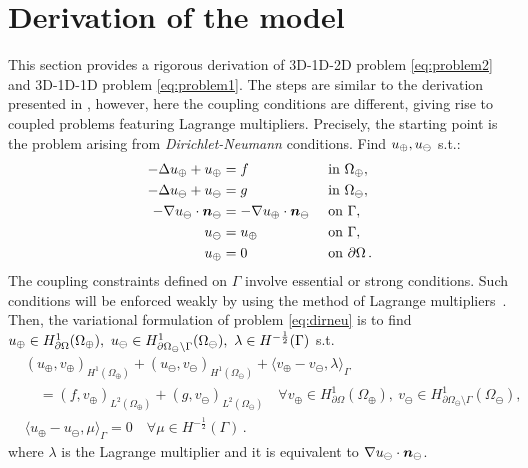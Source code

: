 
\section{Derivation of the model}
This section provides a rigorous derivation of 3D-1D-2D problem \eqref{eq:problem2} and 3D-1D-1D problem \eqref{eq:problem1}. 
The steps are similar to the derivation presented in \cite{laurino_m2an}, 
however, here the coupling conditions are different,
giving rise to coupled problems featuring Lagrange multipliers. 
Precisely, the starting point is the problem arising from \emph{Dirichlet-Neumann} conditions. 
Find $u_{\oplus},u_{\ominus}$ s.t.:
\begin{subequations}\label{eq:dirneu}
\begin{align}
\label{eq:dirneu1}
- \Delta \up  + \up &= f  && \text{ in } \Omega_{\oplus},\\
\label{eq:dirneu2}
- \Delta \uf  + \uf &= g  && \text{ in } \Omega_\ominus,\\
\label{eq:dirneu3}
-\nabla \uf \cdot \nn_{\ominus} &= -\nabla \up \cdot \nn_{\ominus}  && \text{ on } \Gamma,\\
\label{eq:dirneu4}
\uf &= \up && \text{ on }  \Gamma,\\
\label{eq:dirneu5}
\up &= 0 && \text{ on } \partial \Omega\,.
\end{align}
\end{subequations}
The coupling constraints defined on $\Gamma$ involve essential or strong conditions.
Such conditions will be enforced weakly by using the method of Lagrange multipliers~\cite{MR359352}. Then, the variational formulation of problem \eqref{eq:dirneu}
is to find $\up \in H^1_{\partial\Omega}(\Omega_\oplus), \ \uf \in H^1_{\partial\Omega_\ominus\setminus\Gamma}(\Omega_\ominus), \ \lambda \in H^{-\frac 1 2}(\Gamma)$ s.t.
\begin{subequations}\label{eq:weak_dirneu}
\begin{align}
&(u_\oplus,v_\oplus)_{H^1(\Omega_\oplus)} + (u_\ominus,v_\ominus)_{H^1(\Omega_\ominus)} 
+ \langle  v_\oplus - v_\ominus, \lambda \rangle_{\Gamma} 
\\
\nonumber
&\quad = (f,v_\oplus)_{L^2(\Omega_\oplus)} + (g,v_\ominus)_{L^2(\Omega_\ominus)}
\quad \forall v_\oplus \in H^1_{\partial\Omega}(\Omega_\oplus), \ v_\ominus \in H^1_{\partial\Omega_\ominus\setminus\Gamma}(\Omega_\ominus),
\\
& \langle u_\oplus - u_\ominus, \mu \rangle_{\Gamma} = 0
\quad \forall  \mu \in H^{-\frac 1 2}(\Gamma)\,.
\end{align}
\end{subequations}
where $\lambda$ is the Lagrange multiplier and it is equivalent to $\nabla u_{\ominus} \cdot \boldsymbol n_\ominus$.

